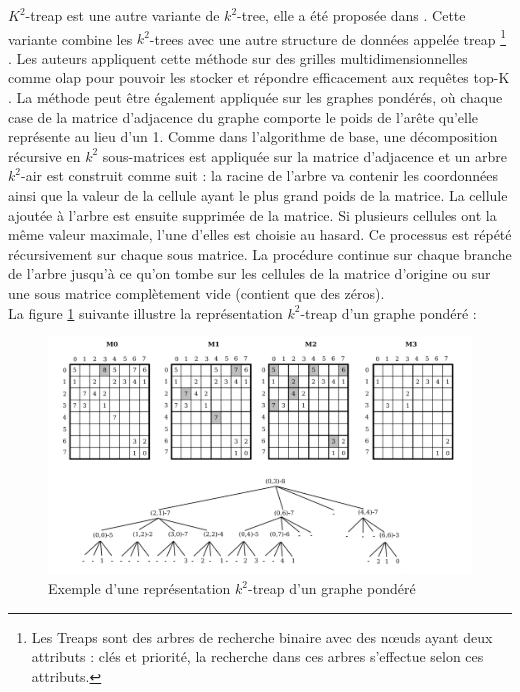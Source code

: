 $K^2$-treap est une autre variante de $k^2$-tree, elle a été proposée dans \citep{brisaboa2014k}. Cette variante combine les $k^2$-trees avec une autre structure de données appelée treap \footnote{Les Treaps sont des arbres de recherche binaire avec des nœuds ayant deux attributs : clés et priorité, la recherche dans ces arbres s'effectue selon ces attributs.} \citep{aragon1989randomized}. Les auteurs appliquent cette méthode sur des grilles multidimensionnelles comme 
\gls{olap} pour pouvoir les stocker et répondre efficacement aux requêtes top-K \citep{badr2013traitement}. La méthode peut être également appliquée sur les graphes pondérés, où chaque case de la matrice d'adjacence du graphe comporte le poids de l'arête qu'elle représente au lieu d'un 1.
Comme dans l'algorithme de base, une décomposition récursive en $k^2$ sous-matrices est appliquée sur la matrice d'adjacence et un arbre $k^2$-air est construit comme suit : la racine de l'arbre va contenir les coordonnées ainsi que la valeur de la cellule ayant le plus grand poids de la matrice. La cellule ajoutée à l'arbre est ensuite supprimée de la matrice. Si plusieurs cellules ont la même valeur maximale, l'une d'elles est choisie au hasard. Ce processus est répété récursivement sur chaque sous matrice. La procédure continue sur chaque branche de l'arbre jusqu'à ce qu'on tombe sur les cellules de la matrice d'origine ou sur une sous matrice complètement vide (contient que des zéros).\\
La figure \ref{k2-treaps} suivante illustre la représentation $k^2$-treap d'un graphe pondéré \citep{badr2013traitement} :

\begin{figure}[H]
\begin{center}
\includegraphics[height=200 pt, width=380 pt]{./ressources/image/k2-treaps.png} 
\end{center}
\caption{Exemple d'une représentation $k^2$-treap d'un graphe pondéré}
\label{k2-treaps}
\end{figure}

